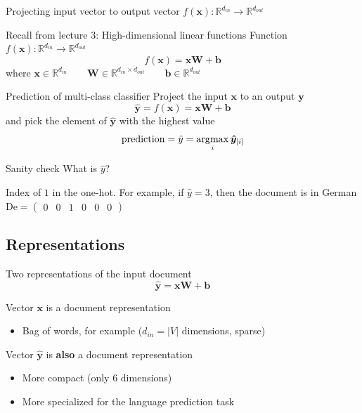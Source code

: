 \documentclass[12pt,aspectratio=169,handout]{beamer}
\begin{document}
\begin{frame}{Projecting input vector to output vector $f(\bm{x}) : \mathbb{R}^{d_{in}} \to \mathbb{R}^{d_{out}}$}
	
	\pause
	\begin{block}{Recall from lecture 3: High-dimensional linear functions}
		Function $f(\bm{x}) : \mathbb{R}^{d_{in}} \to \mathbb{R}^{d_{out}}$
		$$f(\bm{x}) = \bm{x} \bm{W} + \bm{b}$$
		where
		$\bm{x} \in \mathbb{R}^{d_{in}} \qquad
		\bm{W} \in \mathbb{R}^{d_{in} \times d_{out}} \qquad
		\bm{b} \in \mathbb{R}^{d_{out}}$
	\end{block}	
	
	
\end{frame}

\begin{frame}{Prediction of multi-class classifier}
	Project the input $\bm{x}$ to an output $\bm{y}$
	$$\bm{\hat{y}} = f(\bm{x}) = \bm{x} \bm{W} + \bm{b}$$
	and pick the element of $\bm{\hat{y}}$ with the highest value
	$$
	\text{prediction} = \hat{y} = \operatorname*{arg\!\max}_{i} \bm{\hat{y}}_{[i]}
	$$
	
	\begin{block}{Sanity check}
		What is $\hat{y}$?
		
		\pause
		Index of $1$ in the one-hot. 
		For example, if $\hat{y} = 3$, then the document is in German
		$\text{De} = \begin{pmatrix}0 & 0 & 1 & 0 & 0 & 0\end{pmatrix}$
	\end{block}
	
\end{frame}

\subsection{Representations}


\begin{frame}{Two representations of the input document}
	$$\bm{\hat{y}} = \bm{x} \bm{W} + \bm{b}$$
	
	Vector $\bm{x}$ is a document representation
	\begin{itemize}
		\item Bag of words, for example ($d_{in} = |V|$ dimensions, sparse)
	\end{itemize}
	
	Vector $\bm{\hat{y}}$ is \textbf{also} a document representation
	\begin{itemize}
		\item More compact (only 6 dimensions)
		\item More specialized for the language prediction task
	\end{itemize}
	
\end{frame}
\end{document}
